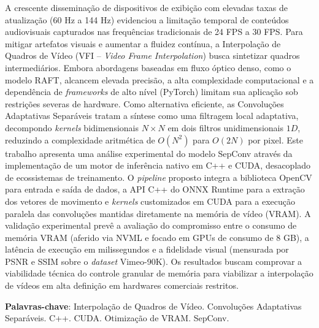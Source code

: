 \documentclass[
    12pt,                %
    openright,           %
    oneside,             %
    a4paper,             %
    english,             %
    brazil               %
]{abntex2}
\begin{document}

\frenchspacing

\pretextual

\imprimircapa

\imprimirfolhaderosto

\begin{resumo}
A crescente disseminação de dispositivos de exibição com elevadas taxas de atualização (60 Hz a 144 Hz) evidenciou a limitação temporal de conteúdos audiovisuais capturados nas frequências tradicionais de 24 FPS a 30 FPS. Para mitigar artefatos visuais e aumentar a fluidez contínua, a Interpolação de Quadros de Vídeo (VFI -- \textit{Video Frame Interpolation}) busca sintetizar quadros intermediários. Embora abordagens baseadas em fluxo óptico denso, como o modelo RAFT, alcancem elevada precisão, a alta complexidade computacional e a dependência de \textit{frameworks} de alto nível (PyTorch) limitam sua aplicação sob restrições severas de hardware. Como alternativa eficiente, as Convoluções Adaptativas Separáveis tratam a síntese como uma filtragem local adaptativa, decompondo \textit{kernels} bidimensionais $N \times N$ em dois filtros unidimensionais $1D$, reduzindo a complexidade aritmética de $O(N^2)$ para $O(2N)$ por pixel. Este trabalho apresenta uma análise experimental do modelo SepConv através da implementação de um motor de inferência nativo em C++ e CUDA, desacoplado de ecossistemas de treinamento. O \textit{pipeline} proposto integra a biblioteca OpenCV para entrada e saída de dados, a API C++ do ONNX Runtime para a extração dos vetores de movimento e \textit{kernels} customizados em CUDA para a execução paralela das convoluções mantidas diretamente na memória de vídeo (VRAM). A validação experimental prevê a avaliação do compromisso entre o consumo de memória VRAM (aferido via NVML e focado em GPUs de consumo de 8 GB), a latência de execução em milissegundos e a fidelidade visual (mensurada por PSNR e SSIM sobre o \textit{dataset} Vimeo-90K). Os resultados buscam comprovar a viabilidade técnica do controle granular de memória para viabilizar a interpolação de vídeos em alta definição em hardwares comerciais restritos.

\vspace{\onelineskip}

\noindent
\textbf{Palavras-chave}: Interpolação de Quadros de Vídeo. Convoluções Adaptativas Separáveis. C++. CUDA. Otimização de VRAM. SepConv.
\end{resumo}
\end{document}
